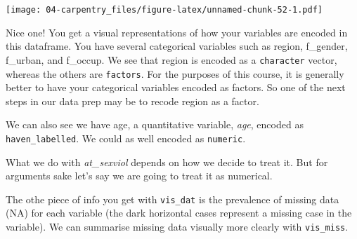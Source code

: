 \documentclass[
]{book}
\newenvironment{Shaded}{\begin{snugshade}}{\end{snugshade}}
\newcommand{\FunctionTok}[1]{\textcolor[rgb]{0.00,0.00,0.00}{#1}}
\newcommand{\NormalTok}[1]{#1}
\newcommand{\OtherTok}[1]{\textcolor[rgb]{0.56,0.35,0.01}{#1}}
\newcommand{\SpecialCharTok}[1]{\textcolor[rgb]{0.00,0.00,0.00}{#1}}
\begin{document}
\texttt{[image: 04-carpentry\_files/figure-latex/unnamed-chunk-52-1.pdf]}

Nice one! You get a visual representations of how your variables are encoded in this dataframe. You have several categorical variables such as region, f\_gender, f\_urban, and f\_occup. We see that region is encoded as a \texttt{character} vector, whereas the others are \texttt{factors}. For the purposes of this course, it is generally better to have your categorical variables encoded as factors. So one of the next steps in our data prep may be to recode region as a factor.

\begin{Shaded}
\end{Shaded}

We can also see we have age, a quantitative variable, \emph{age}, encoded as \texttt{haven\_labelled}. We could as well encoded as \texttt{numeric}.

\begin{Shaded}
\end{Shaded}

What we do with \emph{at\_sexviol} depends on how we decide to treat it. But for arguments sake let's say we are going to treat it as numerical.

\begin{Shaded}
\end{Shaded}

The othe piece of info you get with \texttt{vis\_dat} is the prevalence of missing data (NA) for each variable (the dark horizontal cases represent a missing case in the variable). We can summarise missing data visually more clearly with \texttt{vis\_miss}.
\end{document}
